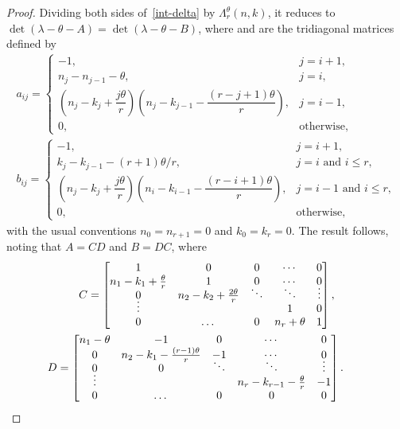\documentclass[pdftex]{sigma}
\theoremstyle{definition}
\begin{document}
\begin{proof}
Dividing both sides of~\eqref{int-delta} by $\Lambda_r^\theta(n,k)$, it reduces to
$\det (\lambda-\theta-A) = \det(\lambda-\theta-B)$,
where  and  are the tridiagonal matrices defined by
\begin{gather*}
a_{ij} = \begin{cases} -1, & j=i+1,\\
n_j-n_{j-1}-\theta ,& j=i,\\
\left(n_j-k_j+\dfrac{j\theta}{r}\right)\left(n_j-k_{j-1}-\dfrac{(r-j+1)\theta}{r}\right), & j=i-1,\\
0 ,& \mbox{otherwise}, \end{cases}
\\
b_{ij} = \begin{cases} -1, & j=i+1,\\
k_j-k_{j-1}-(r+1)\theta/r ,& j=i \mbox{ and } i\le r,\\
\left(n_j-k_j+\dfrac{j\theta}{r}\right)\left(n_i-k_{i-1}-\dfrac{(r-i+1)\theta}{r}\right), & j=i-1 \mbox{ and } i\le r,\\
0 ,& \mbox{otherwise}, \end{cases}
\end{gather*}
with the usual conventions $n_0=n_{r+1}=0$ and $k_0=k_r=0$.
The result follows, noting that $A=CD$ and $B=DC$, where
\begin{gather*}
C=\begin{bmatrix} 1 & 0 & 0 & \cdots & 0\\
n_1-k_1 +\frac{\theta}{r}& 1 & 0 & \cdots & 0\\
0 & n_2-k_2 +\frac{2\theta}{r} & \smash{\ddots} & \smash{\ddots} & \smash{\vdots}\\
\smash{\vdots}&&&1&0\\
0&\dots&0&n_r + \theta &1 \end{bmatrix},\\
D=\begin{bmatrix} n_1 -\theta & -1 & 0 & \cdots & 0\\
0 & n_2-k_1 -\frac{(r-1)\theta}{r}& -1 & \cdots & 0\\
0 & 0 & \smash{\ddots} & \smash{\ddots} & \smash{\vdots}\\
\smash{\vdots}&&&n_r-k_{r-1}-\frac{\theta}{r}&-1\\
0&\dots&0&0 &0 \end{bmatrix}.\tag*{\qed}
\end{gather*}\renewcommand{\qed}{}
\end{proof}
\end{document}
